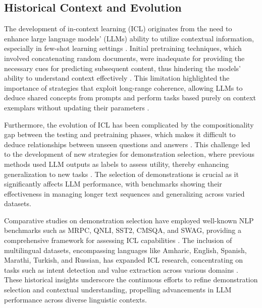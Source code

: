 \subsection{Historical Context and Evolution} \label{subsec:Historical Context and Evolution}

The development of in-context learning (ICL) originates from the need to enhance large language models' (LLMs) ability to utilize contextual information, especially in few-shot learning settings \cite{han2024largelanguagemodelsautomatically}. Initial pretraining techniques, which involved concatenating random documents, were inadequate for providing the necessary cues for predicting subsequent content, thus hindering the models' ability to understand context effectively \cite{shi2024incontextpretraininglanguagemodeling}. This limitation highlighted the importance of strategies that exploit long-range coherence, allowing LLMs to deduce shared concepts from prompts and perform tasks based purely on context exemplars without updating their parameters \cite{tong2024mlpslearnincontextregression}.

Furthermore, the evolution of ICL has been complicated by the compositionality gap between the testing and pretraining phases, which makes it difficult to deduce relationships between unseen questions and answers \cite{zhao2024largelanguagemodelsincontext}. This challenge led to the development of new strategies for demonstration selection, where previous methods used LLM outputs as labels to assess utility, thereby enhancing generalization to new tasks \cite{hashimoto2024steptimeknowincremental}. The selection of demonstrations is crucial as it significantly affects LLM performance, with benchmarks showing their effectiveness in managing longer text sequences and generalizing across varied datasets.

Comparative studies on demonstration selection have employed well-known NLP benchmarks such as MRPC, QNLI, SST2, CMSQA, and SWAG, providing a comprehensive framework for assessing ICL capabilities \cite{shu2024comparativeanalysisdemonstrationselection}. The inclusion of multilingual datasets, encompassing languages like Amharic, English, Spanish, Marathi, Turkish, and Russian, has expanded ICL research, concentrating on tasks such as intent detection and value extraction across various domains \cite{razumovskaia2024analyzingadaptinglargelanguage}. These historical insights underscore the continuous efforts to refine demonstration selection and contextual understanding, propelling advancements in LLM performance across diverse linguistic contexts.










